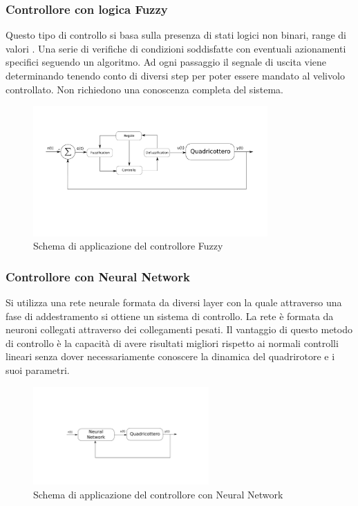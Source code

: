 \subsubsection{Controllore con logica Fuzzy}

Questo tipo di controllo si basa sulla presenza di stati logici non binari, range di valori  . Una serie di verifiche di condizioni soddisfatte con eventuali azionamenti specifici seguendo un algoritmo. Ad ogni passaggio il segnale di uscita viene determinando tenendo conto di diversi step per poter essere mandato al velivolo controllato. Non richiedono una conoscenza completa del sistema.

\begin{figure}
	\centering
	\includegraphics[width=0.8\textwidth]{SistemaQuadrirotore/Figure/Fuzzy}
	\caption{Schema di applicazione del controllore Fuzzy}
\end{figure}

\subsubsection{Controllore con Neural Network}

Si utilizza una rete neurale formata da diversi layer con la quale attraverso una fase di addestramento si ottiene un sistema di controllo. La rete è formata da neuroni collegati attraverso dei collegamenti pesati. Il vantaggio di questo metodo di controllo è la capacità di avere risultati migliori rispetto ai normali controlli lineari senza dover necessariamente conoscere la dinamica del quadrirotore e i suoi parametri.

\begin{figure}
	\centering
	\includegraphics[width=0.6\textwidth]{SistemaQuadrirotore/Figure/NN}
	\caption{Schema di applicazione del controllore con Neural Network}
\end{figure}
